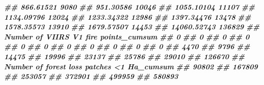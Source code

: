 \documentclass[10pt,landscape,a3paper]{article}
\newenvironment{Shaded}{\begin{snugshade}}{\end{snugshade}}
\newcommand{\DocumentationTok}[1]{\textcolor[rgb]{0.56,0.35,0.01}{\textbf{\textit{#1}}}}
\begin{document}
\begin{Shaded}
\begin{Highlighting}[]
\DocumentationTok{\#\#                             866.61521                                  9080}
\DocumentationTok{\#\#                             951.30586                                 10046}
\DocumentationTok{\#\#                            1055.10104                                 11107}
\DocumentationTok{\#\#                            1134.09796                                 12024}
\DocumentationTok{\#\#                            1233.34322                                 12986}
\DocumentationTok{\#\#                            1397.34476                                 13478}
\DocumentationTok{\#\#                            1578.35573                                 13910}
\DocumentationTok{\#\#                            1679.57507                                 14453}
\DocumentationTok{\#\#                           14060.52743                                136829}
\DocumentationTok{\#\#  Number of VIIRS V1 fire points\_cumsum}
\DocumentationTok{\#\#                                      0}
\DocumentationTok{\#\#                                      0}
\DocumentationTok{\#\#                                      0}
\DocumentationTok{\#\#                                      0}
\DocumentationTok{\#\#                                      0}
\DocumentationTok{\#\#                                      0}
\DocumentationTok{\#\#                                      0}
\DocumentationTok{\#\#                                      0}
\DocumentationTok{\#\#                                      0}
\DocumentationTok{\#\#                                      0}
\DocumentationTok{\#\#                                      0}
\DocumentationTok{\#\#                                   4470}
\DocumentationTok{\#\#                                   9796}
\DocumentationTok{\#\#                                  14475}
\DocumentationTok{\#\#                                  19996}
\DocumentationTok{\#\#                                  23137}
\DocumentationTok{\#\#                                  25786}
\DocumentationTok{\#\#                                  29010}
\DocumentationTok{\#\#                                 126670}
\DocumentationTok{\#\#  Number of forest loss patches \textless{}1 Ha\_cumsum}
\DocumentationTok{\#\#                                       90802}
\DocumentationTok{\#\#                                      167809}
\DocumentationTok{\#\#                                      253057}
\DocumentationTok{\#\#                                      372901}
\DocumentationTok{\#\#                                      499959}
\DocumentationTok{\#\#                                      580893}

\end{Highlighting}
\end{Shaded}
\end{document}
